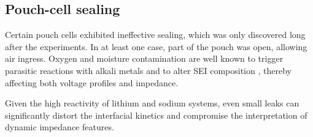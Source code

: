 
\subsection*{Pouch-cell sealing}

Certain pouch cells exhibited ineffective sealing, which was only discovered long after the experiments.  
In at least one case, part of the pouch was open, allowing air ingress. Oxygen and moisture contamination are well known to trigger parasitic reactions with alkali metals and to alter SEI composition \cite{KAWAMURA2006547}, thereby affecting both voltage profiles and impedance.

Given the high reactivity of lithium and sodium systems, even small leaks can significantly distort the interfacial kinetics and compromise the interpretation of dynamic impedance features.






